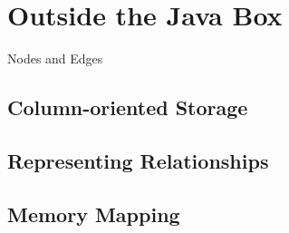 \chapter{Outside the Java Box}
\label{outisde-java-box}

\begin{example}{Nodes and Edges}

\end{example}

\section{Column-oriented Storage}

\section{Representing Relationships}

\section{Memory Mapping}